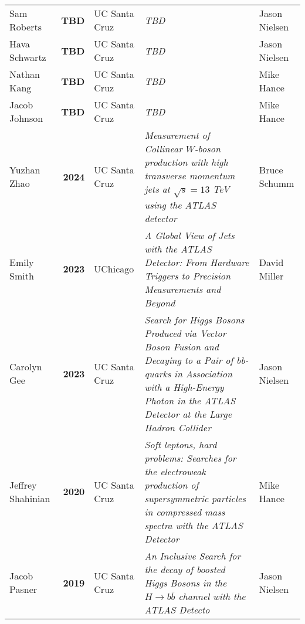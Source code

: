 {
\footnotesize
\begin{tabular}{l|>{\bfseries}r|l|>{\itshape}p{20em}|l}
	\centering
	Sam Roberts       & TBD  & UC Santa Cruz & TBD                                                                                                                                                                                      & Jason Nielsen \\
	Hava Schwartz     & TBD  & UC Santa Cruz & TBD                                                                                                                                                                                      & Jason Nielsen \\
	Nathan Kang       & TBD  & UC Santa Cruz & TBD                                                                                                                                                                                      & Mike Hance    \\
	Jacob Johnson     & TBD  & UC Santa Cruz & TBD                                                                                                                                                                                      & Mike Hance    \\
	Yuzhan Zhao       & 2024 & UC Santa Cruz & Measurement of Collinear $W$-boson production with high transverse momentum jets at $\sqrt{s} = 13$ TeV using the ATLAS detector                                                         & Bruce Schumm  \\
	Emily Smith       & 2023 & UChicago      & A Global View of Jets with the ATLAS Detector: From Hardware Triggers to Precision Measurements and Beyond                                                                               & David Miller  \\
	Carolyn Gee       & 2023 & UC Santa Cruz & Search for Higgs Bosons Produced via Vector Boson Fusion and Decaying to a Pair of bb-quarks in Association with a High-Energy Photon in the ATLAS Detector at the Large Hadron Collider & Jason Nielsen \\
	Jeffrey Shahinian & 2020 & UC Santa Cruz & Soft leptons, hard problems: Searches for the electroweak production of supersymmetric particles in compressed mass spectra with the ATLAS Detector                                      & Mike Hance    \\
	Jacob Pasner      & 2019 & UC Santa Cruz & An Inclusive Search for the decay of boosted Higgs Bosons in the $H\to b\bar{b}$ channel with the ATLAS Detecto                                                                          & Jason Nielsen \\
\end{tabular}
}


